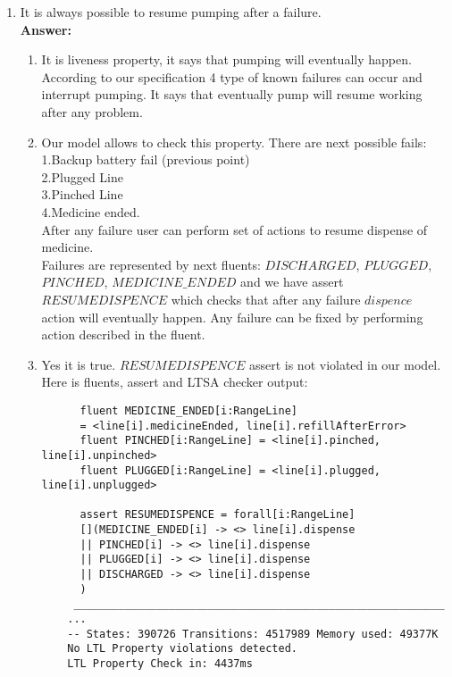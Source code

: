 \documentclass{article}
\begin{document}
\begin{enumerate}
    \item It is always possible to resume pumping after a failure.\\
    \textbf{Answer:}
    \begin{enumerate}
    \item It is liveness property, it says that pumping will eventually happen. According to our specification 4 type of known failures can occur and interrupt
    pumping. It says that eventually pump will resume working after any problem. 
    \item Our model allows to check this property. 
    There are next possible fails:\\
    1.Backup battery fail (previous point)\\
    2.Plugged Line \\
    3.Pinched Line \\
    4.Medicine ended.\\
    After any failure user can perform set of actions to resume dispense of medicine. \\ Failures are represented by next fluents: $DISCHARGED$, $PLUGGED$, $PINCHED$, $MEDICINE\_ENDED$ and we have assert $RESUMEDISPENCE$ which checks that after any failure $dispence$ action will eventually happen. Any failure can be fixed by performing action described in the fluent.\\   
    \item Yes it is true. $RESUMEDISPENCE$ assert is not violated in our model. Here is fluents, assert and LTSA checker output:
      \begin{verbatim}
      fluent MEDICINE_ENDED[i:RangeLine] 
      = <line[i].medicineEnded, line[i].refillAfterError>
      fluent PINCHED[i:RangeLine] = <line[i].pinched, line[i].unpinched>
      fluent PLUGGED[i:RangeLine] = <line[i].plugged, line[i].unplugged>
      
      assert RESUMEDISPENCE = forall[i:RangeLine]
      [](MEDICINE_ENDED[i] -> <> line[i].dispense
      || PINCHED[i] -> <> line[i].dispense
      || PLUGGED[i] -> <> line[i].dispense
      || DISCHARGED -> <> line[i].dispense
      )
     __________________________________________________________
    ...
    -- States: 390726 Transitions: 4517989 Memory used: 49377K
    No LTL Property violations detected.
    LTL Property Check in: 4437ms
    \end{verbatim} 
    \end{enumerate}    
    

\end{enumerate}
\end{document}
